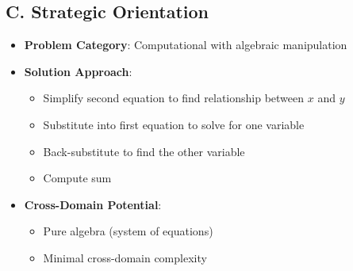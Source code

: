 \documentclass[12pt]{article}
\begin{document}
\begin{problemconfigbox}
\subsection*{C. Strategic Orientation}
\begin{itemize}[leftmargin=*]
    \item \textbf{Problem Category}: Computational with algebraic manipulation
    \item \textbf{Solution Approach}: 
    \begin{itemize}
        \item Simplify second equation to find relationship between $x$ and $y$
        \item Substitute into first equation to solve for one variable
        \item Back-substitute to find the other variable
        \item Compute sum
    \end{itemize}
    \item \textbf{Cross-Domain Potential}: 
    \begin{itemize}
        \item Pure algebra (system of equations)
        \item Minimal cross-domain complexity
    \end{itemize}
\end{itemize}
\end{problemconfigbox}
\end{document}

